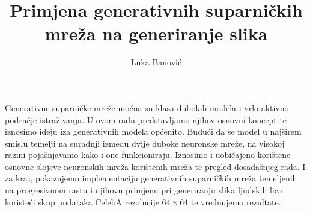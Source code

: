 \documentclass[times, utf8, diplomski, numeric]{fer}
\newcommand\todo[1]{\textcolor{red}{#1}}
\begin{document}
\thesisnumber{\todo{thesis number}}

\title{Primjena generativnih suparničkih mreža na generiranje slika}

\author{Luka Banović}



\zahvala{}

\tableofcontents

















\begin{sazetak}
Generativne suparničke mreže moćna su klasa dubokih modela i vrlo aktivno područje istraživanja. U ovom radu predstavljamo njihov osnovni koncept te iznosimo ideju iza generativnih modela općenito. Budući da se model u najširem smislu temelji na suradnji između dvije duboke neuronske mreže, na visokoj razini pojašnjavamo kako i one funkcioniraju. Iznosimo i uobičajeno korištene osnovne slojeve neuronskih mreža korištenih mreža te pregled dosadašnjeg rada. I za kraj, pokazujemo implementaciju generativnih suparničkih mreža temeljenih na progresivnom rastu i njihovu primjenu pri generiranju slika ljudskih lica koristeći skup podataka CelebA rezolucije $64 \times 64$ te vrednujemo rezultate.

\end{sazetak}
\end{document}

